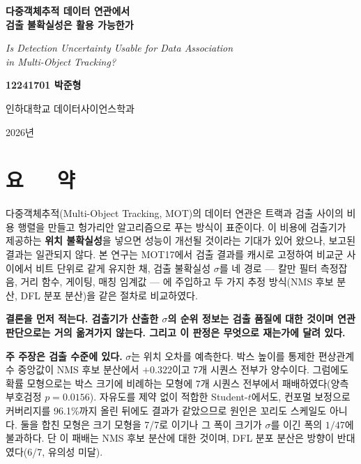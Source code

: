 \documentclass[12pt,a4paper,oneside]{report}
\begin{document}
\begin{titlepage}
\centering
\vspace*{2cm}
{\Huge\bfseries 다중객체추적 데이터 연관에서\\[0.3cm] 검출 불확실성은 활용 가능한가\par}
\vspace{1cm}
{\large\itshape Is Detection Uncertainty Usable for Data Association \\ in Multi-Object Tracking?\par}
\vfill
{\Large\bfseries 12241701 박준형\par}
\vspace{0.6cm}
{\large 인하대학교 데이터사이언스학과\par}
\vspace{1.2cm}
{\large 2026년\par}
\end{titlepage}

\chapter*{요\ \ \ 약}

다중객체추적(Multi-Object Tracking, MOT)의 데이터 연관은 트랙과 검출 사이의 비용 행렬을 만들고 헝가리안 알고리즘으로 푸는 방식이 표준이다. 이 비용에 검출기가 제공하는 \textbf{위치 불확실성}을 넣으면 성능이 개선될 것이라는 기대가 있어 왔으나, 보고된 결과는 일관되지 않다. 본 연구는 MOT17에서 검출 결과를 캐시로 고정하여 비교군 사이에서 비트 단위로 같게 유지한 채, 검출 불확실성 $\sigma$를 네 경로 --- 칼만 필터 측정잡음, 거리 함수, 게이팅, 매칭 임계값 --- 에 주입하고 두 가지 추정 방식(NMS 후보 분산, DFL 분포 분산)을 같은 절차로 비교하였다.

\textbf{결론을 먼저 적는다. 검출기가 산출한 $\sigma$의 순위 정보는 검출 품질에 대한 것이며 연관 판단으로는 거의 옮겨가지 않는다. 그리고 이 판정은 무엇으로 재는가에 달려 있다.}

\textbf{주 주장은 검출 수준에 있다.} $\sigma$는 위치 오차를 예측한다. 박스 높이를 통제한 편상관계수 중앙값이 NMS 후보 분산에서 $+0.322$이고 7개 시퀀스 전부가 양수이다. 그럼에도 확률 모형으로는 박스 크기에 비례하는 모형에 7개 시퀀스 전부에서 패배하였다(양측 부호검정 $p = 0.0156$). 자유도를 제약 없이 적합한 Student-$t$에서도, 컨포멀 보정으로 커버리지를 96.1\%까지 올린 뒤에도 결과가 같았으므로 원인은 꼬리도 스케일도 아니다. 둘을 합친 모형은 크기 모형을 7/7로 이기나 그 폭이 크기가 $\sigma$를 이긴 폭의 $1/47$에 불과하다. 단 이 패배는 NMS 후보 분산에 대한 것이며, DFL 분포 분산은 방향이 반대였다(6/7, 유의성 미달).
\end{document}
